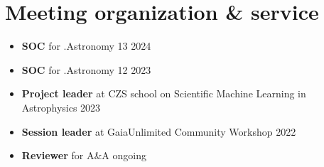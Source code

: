 \section*{Meeting organization \& service}

\begin{itemize}
    \item \textbf{SOC} for .Astronomy 13 \hfill 2024
    \item \textbf{SOC} for .Astronomy 12 \hfill 2023
    \item \textbf{Project leader} at CZS school on Scientific Machine Learning in Astrophysics \hfill 2023
    \item \textbf{Session leader} at GaiaUnlimited Community Workshop \hfill 2022
    \item \textbf{Reviewer} for A\&A \hfill ongoing
\end{itemize}